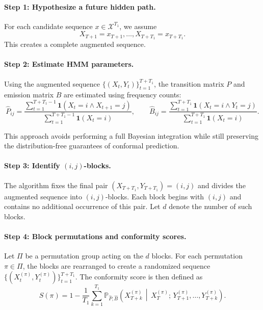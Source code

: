 \documentclass{article}
\begin{document}
\paragraph{Step 1: Hypothesize a future hidden path.}
For each candidate sequence $x\in\mathcal{X}^{T_1}$, we assume
\[
X_{T+1}=x_{T+1},\ldots,X_{T+T_1}=x_{T+T_1}.
\]
This creates a complete augmented sequence.

\paragraph{Step 2: Estimate HMM parameters.}
Using the augmented sequence $\{(X_t,Y_t)\}_{t=1}^{T+T_1}$, the transition matrix $P$ and emission matrix $B$ are estimated using frequency counts:
\begin{equation}
\widehat{P}_{ij}
=
\frac{\sum_{t=1}^{T+T_1-1}\mathbf{1}(X_t=i \wedge X_{t+1}=j)}
{\sum_{t=1}^{T+T_1-1}\mathbf{1}(X_t=i)},
\qquad
\widehat{B}_{ij}
=
\frac{\sum_{t=1}^{T+T_1}\mathbf{1}(X_t=i \wedge Y_t=j)}
{\sum_{t=1}^{T+T_1}\mathbf{1}(X_t=i)}.
\label{eq:phat_bhat}
\end{equation}

This approach avoids performing a full Bayesian integration while still preserving the distribution-free guarantees of conformal prediction.

\paragraph{Step 3: Identify $(i,j)$-blocks.}
The algorithm fixes the final pair $(X_{T+T_1},Y_{T+T_1})=(i,j)$ and divides the augmented sequence into $(i,j)$-blocks. Each block begins with $(i,j)$ and contains no additional occurrence of this pair. Let $d$ denote the number of such blocks.

\paragraph{Step 4: Block permutations and conformity scores.}
Let $\Pi$ be a permutation group acting on the $d$ blocks. For each permutation $\pi\in\Pi$, the blocks are rearranged to create a randomized sequence
$\{(X_t^{(\pi)},Y_t^{(\pi)})\}_{t=1}^{T+T_1}$.
The conformity score is then defined as
\begin{equation}
S(\pi)
=
1-\frac{1}{T_1}\sum_{k=1}^{T_1}
\mathbb{P}_{\widehat{P},\widehat{B}}
\!\left(
X_{T+k}^{(\pi)} \,\middle|\,
X_T^{(\pi)};\,
Y_{T+1}^{(\pi)},\ldots,Y_{T+k}^{(\pi)}
\right).
\label{eq:conformity_score}
\end{equation}
\end{document}
